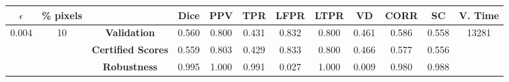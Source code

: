 \begin{longtable}{ c  c | c | c  c  c  c  c  c  c c c}
\toprule \textbf{$\epsilon$} & \textbf{\% pixels} & & \textbf{Dice} & \textbf{PPV} & \textbf{TPR} & \textbf{LFPR} & \textbf{LTPR} & \textbf{VD} & \textbf{CORR} & \textbf{SC} & \textbf{V. Time} \\
\midrule 
\multirow{3}{*}{0.004}  & \multirow{3}{*}{10} &\textbf{Validation} & 0.560 & 0.800 & 0.431 & 0.832 & 0.800 & 0.461 & 0.586 & 0.558 & \multirow{3}{*}{13281} \\
 & & \textbf{Certified Scores} & 0.559 & 0.803 & 0.429 & 0.833 & 0.800 & 0.466 & 0.577 & 0.556 & \\
& & \textbf{Robustness} & 0.995 & 1.000 & 0.991 & 0.027 & 1.000 & 0.009 & 0.980 & 0.988 & \\
\end{longtable}